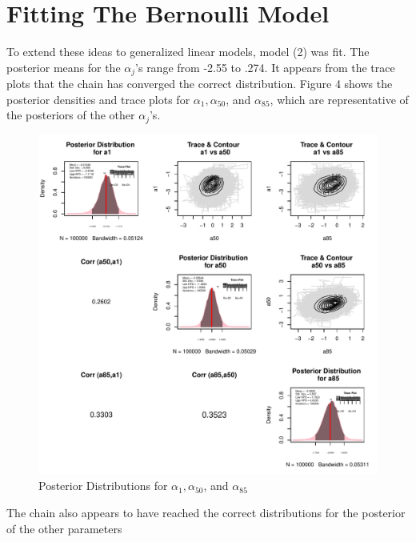 \documentclass{article}
\def\beginmyfig{\begin{figure}[htbp]\begin{center}}
\def\endmyfig{\end{center}\end{figure}}
\begin{document}


\section{Fitting The Bernoulli Model}
To extend these ideas to generalized linear models, model (2) was fit.  The
posterior means for the $\alpha_j$'s range from -2.55 to .274. It appears from
the trace plots that the chain has converged the correct distribution. Figure 4
shows the posterior densities and trace plots for $\alpha_1,\alpha_{50}$, and
$\alpha_{85}$, which are representative of the posteriors of the other
$\alpha_j$'s.\\
\beginmyfig \includegraphics[scale=.5]{images/lapost.pdf} 
            \caption{Posterior Distributions for $\alpha_1,\alpha_{50}$, and $\alpha_{85}$} \endmyfig 
\noindent
The chain also appears to have reached the correct distributions for the posterior of the other parameters
\end{document}
